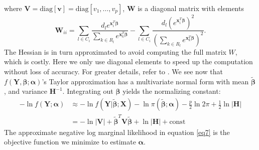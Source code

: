 where $\bm{V} = \text{diag}[\bm{v}]=\text{diag}[v_1,\dots,v_p]$, $\bm{W}$ is a diagonal matrix with elements 
$$ \bm{W}_{ii} = \sum_{l\in C_i}\frac{d_le^{\bm{x}_i^T\bm{\beta}}}{\sum_{k\in R_l}e^{\bm{x}_k^T\bm{\beta}}} - \sum_{l\in C_i}\frac{d_l(e^{\bm{x}_i^T\bm{\beta}})^2}{(\sum_{k\in R_l}e^{\bm{x}_k^T\bm{\beta}})^2}. $$ 
The Hessian is in turn approximated to avoid computing the full matrix $W$, which is costly. Here we only use diagonal elements to speed up the computation without loss of accuracy. For greater details, refer to \cite{simon2011regularization}.
We see now that $f(\bm{Y}, \bm{\beta};\bm{\alpha})$'s Taylor approximation has a multivariate normal form with mean $\tilde{\bm{\beta}}$, and variance $\bm{H}^{-1}$. Integrating out $\bm{\beta}$ yields the normalizing constant:
\begin{equation} \label{eq7}
\begin{aligned}
    -\ln{f(\bm{Y};\bm{\alpha})} &\approx -\ln f(\bm{Y}|\tilde{\bm{\beta}};\bm{X}) - \ln \pi(\tilde{\bm{\beta}};\bm{\alpha}) - \frac{p}{2}\ln{2\pi} + \frac{1}{2}\ln{|\bm{H}|} \\
    &= -\ln{|\bm{V}|} + \tilde{\bm{\beta}}^T\bm{V}\tilde{\bm{\beta}} + \ln{|\bm{H}|} + \text{const}
\end{aligned}
\end{equation}
The approximate negative log marginal likelihood in equation \eqref{eq7} is the objective function we  minimize to estimate $\bm{\alpha}$.

